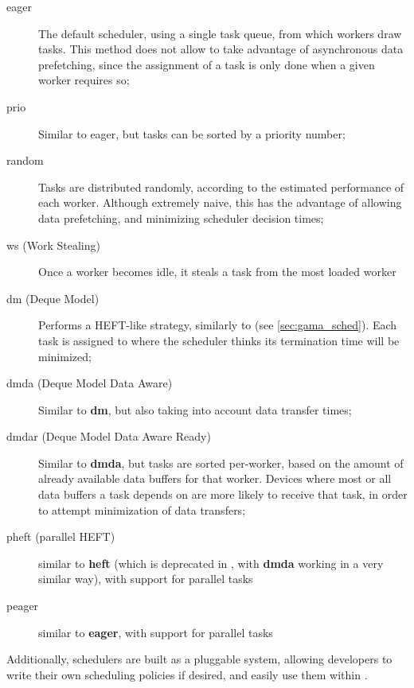 \documentclass[main.tex]{subfiles}
\begin{document}
\begin{description}

\item[eager] The default scheduler, using a single task queue, from which workers draw tasks. This method does not allow to take advantage of asynchronous data prefetching, since the assignment of a task is only done when a given worker requires so;

\item[prio] Similar to eager, but tasks can be sorted by a priority number;

\item[random] Tasks are distributed randomly, according to the estimated performance of each worker. Although extremely naive, this has the advantage of allowing data prefetching, and minimizing scheduler decision times;

\item[ws (Work Stealing)] Once a worker becomes idle, it steals a task from the most loaded worker

\item[dm (Deque Model)] Performs a HEFT-like strategy, similarly to \gama (see \cref{sec:gama_sched}). Each task is assigned to where the scheduler thinks its termination time will be minimized;

\item[dmda (Deque Model Data Aware)] Similar to \textbf{dm}, but also taking into account data transfer times;

\item[dmdar (Deque Model Data Aware Ready)] Similar to \textbf{dmda}, but tasks are sorted per-worker, based on the amount of already available data buffers for that worker. Devices where most or all data buffers a task depends on are more likely to receive that task, in order to attempt minimization of data transfers;

\item[pheft (parallel HEFT)] similar to \textbf{heft} (which is deprecated in \starpu, with \textbf{dmda} working in a very similar way), with support for parallel tasks

\item[peager] similar to \textbf{eager}, with support for parallel tasks

\end{description}

Additionally, schedulers are built as a pluggable system, allowing developers to write their own scheduling policies if desired, and easily use them within \starpu.
\end{document}
